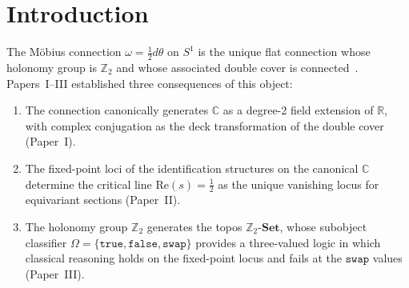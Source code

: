 \documentclass[12pt,a4paper]{article}
\theoremstyle{definition}
\theoremstyle{remark}
\newcommand{\Z}{\mathbb{Z}}
\newcommand{\R}{\mathbb{R}}
\newcommand{\C}{\mathbb{C}}
\newcommand{\ZSet}{\Z_2\text{-}\mathbf{Set}}
\newcommand{\swap}{\mathtt{swap}}
\begin{document}
\begin{abstract}
The spectral rigidity is identified as the three-valued
subobject classifier of Paper~III propagating through the tower:
the singular values $\{0, 1, \sqrt{2}\}$ are the norms of the
membership vectors on the two-sheeted M\"{o}bius cover, the
squared norms yield a Born rule (observable = amplitude squared),
and the transformation between the holonomy eigenbasis and the
sheet basis is the Hadamard gate. The $\swap$ truth value is a
coherent superposition of the $\pm 1$ holonomy eigenvalues,
preserved without decoherence at every level.

This paper is the fourth in a series.
Paper~I~\cite{MorganI} establishes the M\"{o}bius connection as
the canonical generator of arithmetic structure.
Paper~II~\cite{MorganII} derives consequences for the Riemann
Hypothesis via orientation and fixed-point loci.
Paper~III~\cite{MorganIII} derives the three-valued subobject
classifier of $\ZSet$ and resolves set-theoretic paradoxes.
\end{abstract}

\tableofcontents
\newpage

\section{Introduction}
\label{sec:intro}

The M\"{o}bius connection $\omega = \tfrac{1}{2}d\theta$ on $S^1$
is the unique flat connection whose holonomy group is $\Z_2$ and
whose associated double cover is connected~\cite{MorganI}.
Papers~I--III established three consequences of this object:

\begin{enumerate}[label=(\roman*), nosep]
  \item The connection canonically generates $\C$ as a degree-2
  field extension of $\R$, with complex conjugation as the
  deck transformation of the double cover (Paper~I).
  \item The fixed-point loci of the identification structures
  on the canonical $\C$ determine the critical line
  $\mathrm{Re}(s) = \tfrac{1}{2}$ as the unique vanishing
  locus for equivariant sections (Paper~II).
  \item The holonomy group $\Z_2$ generates the topos $\ZSet$,
  whose subobject classifier
  $\Omega = \{\mathtt{true}, \mathtt{false}, \swap\}$ provides
  a three-valued logic in which classical reasoning holds on
  the fixed-point locus and fails at the $\swap$ values
  (Paper~III).
\end{enumerate}
\end{document}
